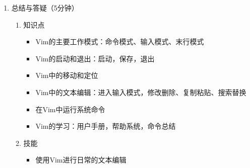 \documentclass{TIJMUjiaoanLL}
\begin{document}
\begin{enumerate}
  \item 总结与答疑（5分钟）
    \begin{enumerate}
      \item 知识点
	\begin{itemize}
          \item Vim的主要工作模式：命令模式、输入模式、末行模式
          \item Vim的启动和退出：启动，保存，退出
          \item Vim中的移动和定位
          \item Vim中的文本编辑：进入输入模式，修改删除、复制粘贴、搜索替换
          \item 在Vim中运行系统命令
          \item Vim的学习：用户手册，帮助系统，命令总结
	\end{itemize}
      \item 技能
	\begin{itemize}
          \item 使用Vim进行日常的文本编辑
	\end{itemize}
    \end{enumerate}

\end{enumerate}

\otherTail
\end{document}
